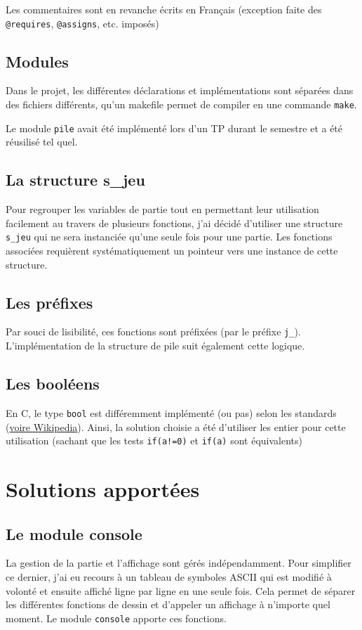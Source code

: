 \documentclass[a4paper, titlepage]{article}
\begin{document}
Les commentaires sont en revanche écrits en Français (exception faite des \texttt{@requires}, \texttt{@assigns}, etc. imposés)

\subsection{Modules}
Dans le projet, les différentes déclarations et implémentations sont séparées dans des fichiers différents, qu'un makefile permet de compiler en une commande \texttt{make}.

Le module \texttt{pile} avait été implémenté lors d'un TP durant le semestre et a été réusilisé tel quel.

\subsection{La structure s\_jeu}
Pour regrouper les variables de partie tout en permettant leur utilisation facilement au travers de plusieurs fonctions, j'ai décidé d'utiliser une structure \texttt{s\_jeu} qui ne sera instanciée qu'une seule fois pour une partie. Les fonctions associées requièrent systématiquement un pointeur vers une instance de cette structure.

\subsection{Les préfixes}
Par souci de lisibilité, ces fonctions sont préfixées (par le préfixe \texttt{j\_}). L'implémentation de la structure de pile suit également cette logique.

\subsection{Les booléens}
En C, le type \texttt{bool} est différemment implémenté (ou pas) selon les standards (\href{https://en.wikipedia.org/wiki/C_data_types#stdbool.h}{voire Wikipedia}). Ainsi, la solution choisie a été d'utiliser les entier pour cette utilisation (sachant que les tests \texttt{if(a!=0)} et \texttt{if(a)} sont équivalents)

\section{Solutions apportées}
\subsection{Le module console}
La gestion de la partie et l'affichage sont gérés indépendamment. Pour simplifier ce dernier, j'ai eu recours à un tableau de symboles ASCII qui est modifié à volonté et ensuite affiché ligne par ligne en une seule fois. Cela permet de séparer les différentes fonctions de dessin et d'appeler un affichage à n'importe quel moment. Le module \texttt{console} apporte ces fonctions.
\end{document}
